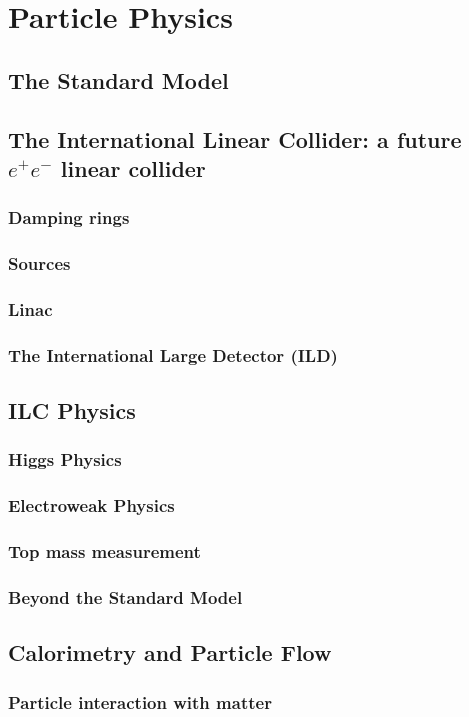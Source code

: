 \chapter{Particle Physics}
\section{The Standard Model}
\section{The International Linear Collider: a future $e^+e^-$ linear collider}
\subsection{Damping rings}
\subsection{Sources}
\subsection{Linac}
\subsection{The International Large Detector (ILD)}
\section{ILC Physics}
\subsection{Higgs Physics}
\subsection{Electroweak Physics}
\subsection{Top mass measurement}
\subsection{Beyond the Standard Model}
\section{Calorimetry and Particle Flow}
\subsection{Particle interaction with matter}
